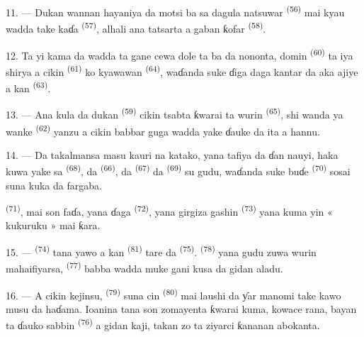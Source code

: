 11. --- Dukan wannan hayaniya da motsi ba sa dagula natsuwar
 \textsuperscript{(56)} mai kyau wadda take kaɗa
 \textsuperscript{(57)}, alhali ana tatsarta a
gaban ƙofar  \textsuperscript{(58)}.

12. Ta yi kama da wadda ta gane cewa dole ta ba da nononta, domin
 \textsuperscript{(60)} ta iya shirya  a cikin  \textsuperscript{(61)} ko
kyawawan  \textsuperscript{(64)}, waɗanda suke ɗiga daga
kantar da aka ajiye a kan 
\textsuperscript{(63)}.

13. --- Ana kula da dukan  \textsuperscript{(59)}
cikin tsabta ƙwarai ta wurin 
\textsuperscript{(65)}, shi wanda ya wanke  \textsuperscript{(62)} yanzu
a cikin babbar guga wadda yake ɗauke da ita a hannu.

\VUsaut{3.0mm}
\VUsaut{3.0mm}

14. --- Da takalmansa masu kauri na katako, yana tafiya da ɗan nauyi,
haka kuwa yake sa  \textsuperscript{(68)}, da
 \textsuperscript{(66)}, da 
\textsuperscript{(67)} da  \textsuperscript{(69)}
su gudu, waɗanda suke buɗe  \textsuperscript{(70)}
sosai suna kuka da fargaba.

 \textsuperscript{(71)}, mai son faɗa, yana ɗaga
 \textsuperscript{(72)}, yana girgiza gashin
 \textsuperscript{(73)} yana kuma yin « kukuruku »
mai ƙara.

15. ---  \textsuperscript{(74)} tana yawo a kan
 \textsuperscript{(81)} tare da 
\textsuperscript{(75)}.  \textsuperscript{(78)} yana
gudu zuwa wurin mahaifiyarsa, 
\textsuperscript{(77)} babba wadda muke gani kusa da gidan aladu.

16. --- A cikin kejinsu,  \textsuperscript{(79)} suna
cin  \textsuperscript{(80)} mai laushi da ƴar manomi take
kawo musu da haɗama. Ioanina tana son zomayenta ƙwarai kuma, kowace
rana, bayan ta ɗauko sabbin  \textsuperscript{(76)} a gidan
kaji, takan zo ta ziyarci ƙananan abokanta.

\VUsaut{6.0mm}
\VUfilet{22mm}
